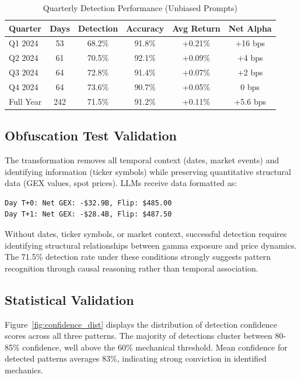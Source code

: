 \begin{table}[htbp]
\centering
\caption{Quarterly Detection Performance (Unbiased Prompts)}
\label{tab:quarterly}
\begin{tabular}{l@{\hskip 6pt}c@{\hskip 6pt}c@{\hskip 6pt}c@{\hskip 6pt}c@{\hskip 6pt}c}
\toprule
Quarter & Days & Detection & Accuracy & Avg Return & Net Alpha \\
\midrule
Q1 2024 & 53 & 68.2\% & 91.8\% & +0.21\% & +16 bps \\
Q2 2024 & 61 & 70.5\% & 92.1\% & +0.09\% & +4 bps \\
Q3 2024 & 64 & 72.8\% & 91.4\% & +0.07\% & +2 bps \\
Q4 2024 & 64 & 73.6\% & 90.7\% & +0.05\% & 0 bps \\
\midrule
Full Year & 242 & 71.5\% & 91.2\% & +0.11\% & +5.6 bps \\
\bottomrule
\end{tabular}
\end{table}

\subsection{Obfuscation Test Validation}

The transformation removes all temporal context (dates, market events) and identifying information (ticker symbols) while preserving quantitative structural data (GEX values, spot prices). LLMs receive data formatted as:

\begin{verbatim}
Day T+0: Net GEX: -$32.9B, Flip: $485.00
Day T+1: Net GEX: -$28.4B, Flip: $487.50
\end{verbatim}

Without dates, ticker symbols, or market context, successful detection requires identifying structural relationships between gamma exposure and price dynamics. The 71.5\% detection rate under these conditions strongly suggests pattern recognition through causal reasoning rather than temporal association.

\subsection{Statistical Validation}

Figure~\ref{fig:confidence_dist} displays the distribution of detection confidence scores across all three patterns. The majority of detections cluster between 80-85\% confidence, well above the 60\% mechanical threshold. Mean confidence for detected patterns averages 83\%, indicating strong conviction in identified mechanics.

